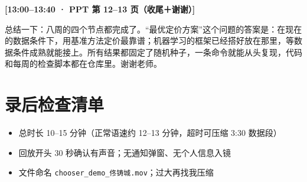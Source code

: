 \documentclass[11pt]{ctexart}
\newcommand{\cue}[1]{\noindent\colorbox{gray!15}{\parbox{\dimexpr\linewidth-2\fboxsep}{\textbf{#1}}}\par\smallskip}
\begin{document}
\cue{[13:00--13:40 · PPT 第 12--13 页（收尾＋谢谢）]}
总结一下：八周的四个节点都完成了。“最优定价方案”这个问题的答案是：在现在的数据条件下，用基准方法定价最靠谱；机器学习的框架已经搭好放在那里，等数据条件成熟就能接上。所有结果都固定了随机种子，一条命令就能从头复现，代码和每周的检查脚本都在仓库里。谢谢老师。

\section*{录后检查清单}
\begin{itemize}
  \item[$\square$] 总时长 10--15 分钟（正常语速约 12--13 分钟，超时可压缩 3:30 数据段）
  \item[$\square$] 回放开头 30 秒确认有声音；无通知弹窗、无个人信息入镜
  \item[$\square$] 文件命名 \texttt{chooser\_demo\_佟铸城.mov}；过大再找我压缩
\end{itemize}
\end{document}
